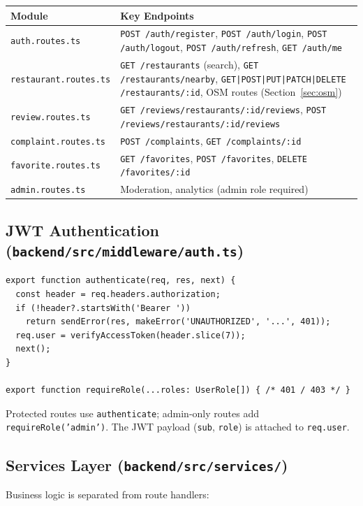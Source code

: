 \documentclass[11pt,a4paper]{article}
\begin{document}
\begin{tabular}{@{}p{3.2cm}p{9.5cm}@{}}
\toprule
\textbf{Module} & \textbf{Key Endpoints} \\
\midrule
\texttt{auth.routes.ts} &
  \texttt{POST /auth/register}, \texttt{POST /auth/login},
  \texttt{POST /auth/logout}, \texttt{POST /auth/refresh}, \texttt{GET /auth/me} \\
\texttt{restaurant.routes.ts} &
  \texttt{GET /restaurants} (search), \texttt{GET /restaurants/nearby},
  \texttt{GET|POST|PUT|PATCH|DELETE /restaurants/:id},
  OSM routes (Section~\ref{sec:osm}) \\
\texttt{review.routes.ts} &
  \texttt{GET /reviews/restaurants/:id/reviews},
  \texttt{POST /reviews/restaurants/:id/reviews} \\
\texttt{complaint.routes.ts} &
  \texttt{POST /complaints}, \texttt{GET /complaints/:id} \\
\texttt{favorite.routes.ts} &
  \texttt{GET /favorites}, \texttt{POST /favorites}, \texttt{DELETE /favorites/:id} \\
\texttt{admin.routes.ts} &
  Moderation, analytics (admin role required) \\
\bottomrule
\end{tabular}

\subsection{JWT Authentication (\texttt{backend/src/middleware/auth.ts})}

\begin{lstlisting}
export function authenticate(req, res, next) {
  const header = req.headers.authorization;
  if (!header?.startsWith('Bearer '))
    return sendError(res, makeError('UNAUTHORIZED', '...', 401));
  req.user = verifyAccessToken(header.slice(7));
  next();
}

export function requireRole(...roles: UserRole[]) { /* 401 / 403 */ }
\end{lstlisting}

Protected routes use \texttt{authenticate}; admin-only routes add \texttt{requireRole('admin')}.
The JWT payload (\texttt{sub}, \texttt{role}) is attached to \texttt{req.user}.

\subsection{Services Layer (\texttt{backend/src/services/})}

Business logic is separated from route handlers:
\end{document}
